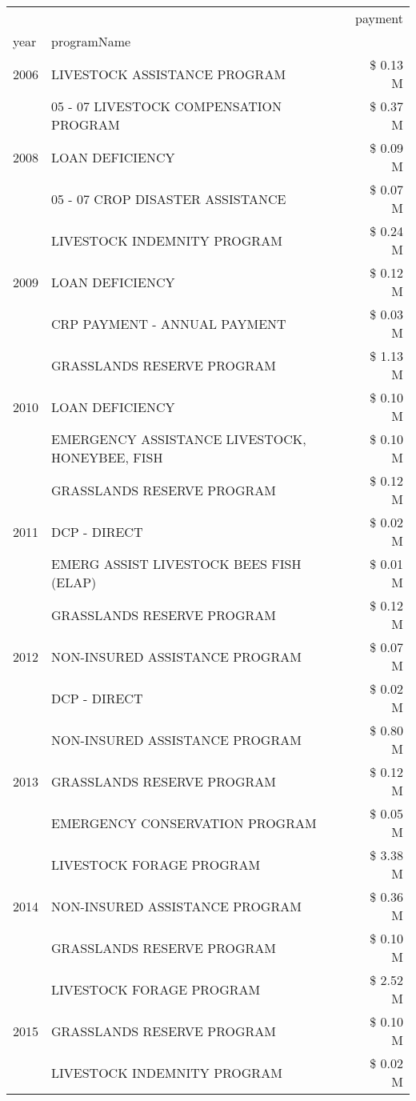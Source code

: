 \begin{tabular}{llr}
\toprule
 &  & payment \\
year & programName &  \\
\midrule
2006 & LIVESTOCK ASSISTANCE PROGRAM & \$ 0.13 M \\
\cline{1-3}
\multirow[t]{3}{*}{2008} & 05 - 07 LIVESTOCK COMPENSATION PROGRAM & \$ 0.37 M \\
 & LOAN DEFICIENCY & \$ 0.09 M \\
 & 05 - 07 CROP DISASTER ASSISTANCE & \$ 0.07 M \\
\cline{1-3}
\multirow[t]{3}{*}{2009} & LIVESTOCK INDEMNITY PROGRAM & \$ 0.24 M \\
 & LOAN DEFICIENCY & \$ 0.12 M \\
 & CRP PAYMENT - ANNUAL PAYMENT & \$ 0.03 M \\
\cline{1-3}
\multirow[t]{3}{*}{2010} & GRASSLANDS RESERVE PROGRAM & \$ 1.13 M \\
 & LOAN DEFICIENCY & \$ 0.10 M \\
 & EMERGENCY ASSISTANCE LIVESTOCK, HONEYBEE, FISH & \$ 0.10 M \\
\cline{1-3}
\multirow[t]{3}{*}{2011} & GRASSLANDS RESERVE PROGRAM & \$ 0.12 M \\
 & DCP - DIRECT & \$ 0.02 M \\
 & EMERG ASSIST LIVESTOCK BEES FISH (ELAP) & \$ 0.01 M \\
\cline{1-3}
\multirow[t]{3}{*}{2012} & GRASSLANDS RESERVE PROGRAM & \$ 0.12 M \\
 & NON-INSURED ASSISTANCE PROGRAM & \$ 0.07 M \\
 & DCP - DIRECT & \$ 0.02 M \\
\cline{1-3}
\multirow[t]{3}{*}{2013} & NON-INSURED ASSISTANCE PROGRAM & \$ 0.80 M \\
 & GRASSLANDS RESERVE PROGRAM & \$ 0.12 M \\
 & EMERGENCY CONSERVATION PROGRAM & \$ 0.05 M \\
\cline{1-3}
\multirow[t]{3}{*}{2014} & LIVESTOCK FORAGE PROGRAM & \$ 3.38 M \\
 & NON-INSURED ASSISTANCE PROGRAM & \$ 0.36 M \\
 & GRASSLANDS RESERVE PROGRAM & \$ 0.10 M \\
\cline{1-3}
\multirow[t]{3}{*}{2015} & LIVESTOCK FORAGE PROGRAM & \$ 2.52 M \\
 & GRASSLANDS RESERVE PROGRAM & \$ 0.10 M \\
 & LIVESTOCK INDEMNITY PROGRAM & \$ 0.02 M \\

\end{tabular}
